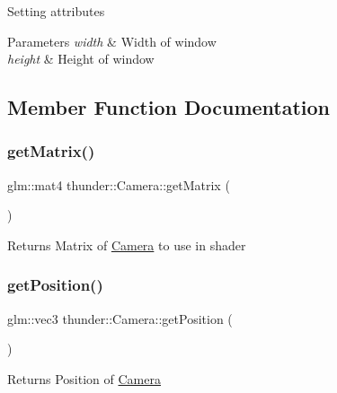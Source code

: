 Setting attributes


\begin{DoxyParams}{Parameters}
{\em width} & Width of window \\
\hline
{\em height} & Height of window \\
\hline
\end{DoxyParams}


\subsection{Member Function Documentation}
\mbox{\label{classthunder_1_1_camera_aca107f66761e0d19615b4ade8c706c66}} 
\subsubsection{\texorpdfstring{get\+Matrix()}{getMatrix()}}
{\footnotesize\ttfamily glm\+::mat4 thunder\+::\+Camera\+::get\+Matrix (\begin{DoxyParamCaption}{ }\end{DoxyParamCaption})}

\begin{DoxyReturn}{Returns}
Matrix of \mbox{\hyperlink{classthunder_1_1_camera}{Camera}} to use in shader 
\end{DoxyReturn}
\mbox{\label{classthunder_1_1_camera_a56cd58d018436be6bb1cd47a8d356021}} 
\subsubsection{\texorpdfstring{get\+Position()}{getPosition()}}
{\footnotesize\ttfamily glm\+::vec3 thunder\+::\+Camera\+::get\+Position (\begin{DoxyParamCaption}{ }\end{DoxyParamCaption})}

\begin{DoxyReturn}{Returns}
Position of \mbox{\hyperlink{classthunder_1_1_camera}{Camera}} 
\end{DoxyReturn}
\mbox{\label{classthunder_1_1_camera_a6161ae2a40fe77a56fec1cf058241d29}} 
